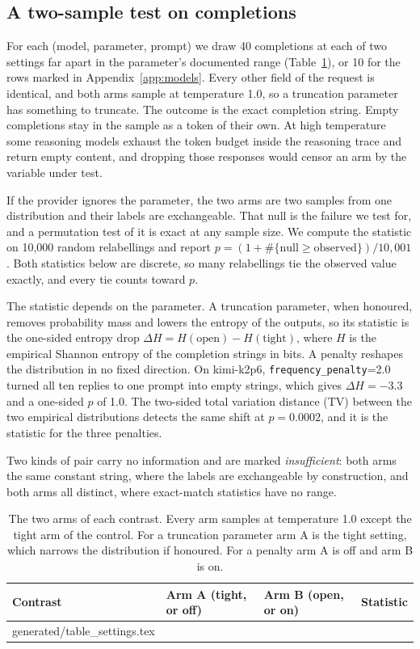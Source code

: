 \documentclass[10pt]{article}
\makeatletter
\newcommand{\p}[1]{\texttt{#1}}
\newcommand{\inputrows}[1]{\@@input #1 }
\makeatother
\begin{document}
\subsection{A two-sample test on completions}

For each (model, parameter, prompt) we draw 40 completions at each of two settings far apart in the parameter's documented range (Table~\ref{tab:settings}), or 10 for the rows marked in Appendix~\ref{app:models}. Every other field of the request is identical, and both arms sample at temperature 1.0, so a truncation parameter has something to truncate. The outcome is the exact completion string. Empty completions stay in the sample as a token of their own. At high temperature some reasoning models exhaust the token budget inside the reasoning trace and return empty content, and dropping those responses would censor an arm by the variable under test.

If the provider ignores the parameter, the two arms are two samples from one distribution and their labels are exchangeable. That null is the failure we test for, and a permutation test of it is exact at any sample size. We compute the statistic on 10{,}000 random relabellings and report $p = (1 + \#\{\text{null} \geq \text{observed}\})/10{,}001$. Both statistics below are discrete, so many relabellings tie the observed value exactly, and every tie counts toward $p$.

The statistic depends on the parameter. A truncation parameter, when honoured, removes probability mass and lowers the entropy of the outputs, so its statistic is the one-sided entropy drop $\Delta H = H(\text{open}) - H(\text{tight})$, where $H$ is the empirical Shannon entropy of the completion strings in bits. A penalty reshapes the distribution in no fixed direction. On kimi-k2p6, \p{frequency\_penalty}=2.0 turned all ten replies to one prompt into empty strings, which gives $\Delta H = -3.3$ and a one-sided $p$ of 1.0. The two-sided total variation distance (TV) between the two empirical distributions detects the same shift at $p = 0.0002$, and it is the statistic for the three penalties.

Two kinds of pair carry no information and are marked \emph{insufficient}: both arms the same constant string, where the labels are exchangeable by construction, and both arms all distinct, where exact-match statistics have no range.

\begin{table}[t]
\centering
\small
\caption{The two arms of each contrast. Every arm samples at temperature 1.0 except the tight arm of the control. For a truncation parameter arm A is the tight setting, which narrows the distribution if honoured. For a penalty arm A is off and arm B is on.}
\label{tab:settings}
\begin{tabular}{llll}
\toprule
Contrast & Arm A (tight, or off) & Arm B (open, or on) & Statistic \\
\midrule
\inputrows{generated/table_settings.tex}
\bottomrule
\end{tabular}
\end{table}
\end{document}

